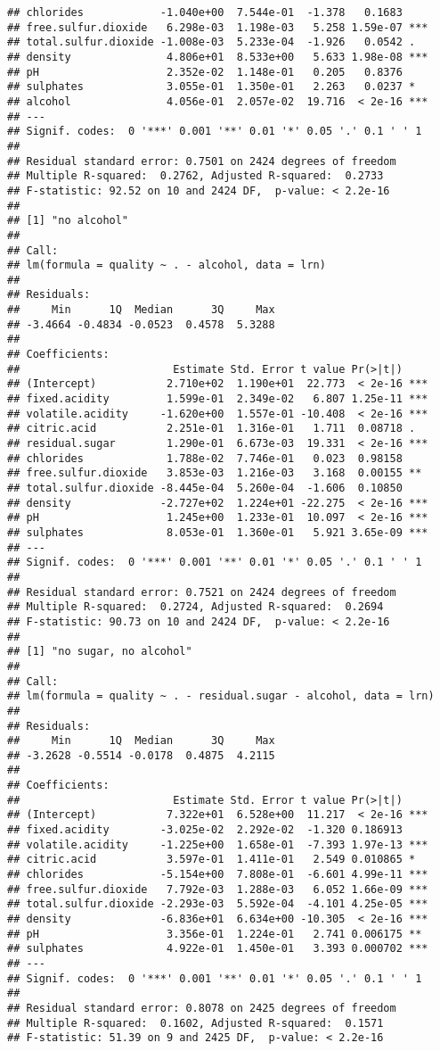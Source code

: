 \documentclass[
]{article}
\begin{document}
\begin{verbatim}
## chlorides            -1.040e+00  7.544e-01  -1.378   0.1683    
## free.sulfur.dioxide   6.298e-03  1.198e-03   5.258 1.59e-07 ***
## total.sulfur.dioxide -1.008e-03  5.233e-04  -1.926   0.0542 .  
## density               4.806e+01  8.533e+00   5.633 1.98e-08 ***
## pH                    2.352e-02  1.148e-01   0.205   0.8376    
## sulphates             3.055e-01  1.350e-01   2.263   0.0237 *  
## alcohol               4.056e-01  2.057e-02  19.716  < 2e-16 ***
## ---
## Signif. codes:  0 '***' 0.001 '**' 0.01 '*' 0.05 '.' 0.1 ' ' 1
## 
## Residual standard error: 0.7501 on 2424 degrees of freedom
## Multiple R-squared:  0.2762, Adjusted R-squared:  0.2733 
## F-statistic: 92.52 on 10 and 2424 DF,  p-value: < 2.2e-16
## 
## [1] "no alcohol"
## 
## Call:
## lm(formula = quality ~ . - alcohol, data = lrn)
## 
## Residuals:
##     Min      1Q  Median      3Q     Max 
## -3.4664 -0.4834 -0.0523  0.4578  5.3288 
## 
## Coefficients:
##                        Estimate Std. Error t value Pr(>|t|)    
## (Intercept)           2.710e+02  1.190e+01  22.773  < 2e-16 ***
## fixed.acidity         1.599e-01  2.349e-02   6.807 1.25e-11 ***
## volatile.acidity     -1.620e+00  1.557e-01 -10.408  < 2e-16 ***
## citric.acid           2.251e-01  1.316e-01   1.711  0.08718 .  
## residual.sugar        1.290e-01  6.673e-03  19.331  < 2e-16 ***
## chlorides             1.788e-02  7.746e-01   0.023  0.98158    
## free.sulfur.dioxide   3.853e-03  1.216e-03   3.168  0.00155 ** 
## total.sulfur.dioxide -8.445e-04  5.260e-04  -1.606  0.10850    
## density              -2.727e+02  1.224e+01 -22.275  < 2e-16 ***
## pH                    1.245e+00  1.233e-01  10.097  < 2e-16 ***
## sulphates             8.053e-01  1.360e-01   5.921 3.65e-09 ***
## ---
## Signif. codes:  0 '***' 0.001 '**' 0.01 '*' 0.05 '.' 0.1 ' ' 1
## 
## Residual standard error: 0.7521 on 2424 degrees of freedom
## Multiple R-squared:  0.2724, Adjusted R-squared:  0.2694 
## F-statistic: 90.73 on 10 and 2424 DF,  p-value: < 2.2e-16
## 
## [1] "no sugar, no alcohol"
## 
## Call:
## lm(formula = quality ~ . - residual.sugar - alcohol, data = lrn)
## 
## Residuals:
##     Min      1Q  Median      3Q     Max 
## -3.2628 -0.5514 -0.0178  0.4875  4.2115 
## 
## Coefficients:
##                        Estimate Std. Error t value Pr(>|t|)    
## (Intercept)           7.322e+01  6.528e+00  11.217  < 2e-16 ***
## fixed.acidity        -3.025e-02  2.292e-02  -1.320 0.186913    
## volatile.acidity     -1.225e+00  1.658e-01  -7.393 1.97e-13 ***
## citric.acid           3.597e-01  1.411e-01   2.549 0.010865 *  
## chlorides            -5.154e+00  7.808e-01  -6.601 4.99e-11 ***
## free.sulfur.dioxide   7.792e-03  1.288e-03   6.052 1.66e-09 ***
## total.sulfur.dioxide -2.293e-03  5.592e-04  -4.101 4.25e-05 ***
## density              -6.836e+01  6.634e+00 -10.305  < 2e-16 ***
## pH                    3.356e-01  1.224e-01   2.741 0.006175 ** 
## sulphates             4.922e-01  1.450e-01   3.393 0.000702 ***
## ---
## Signif. codes:  0 '***' 0.001 '**' 0.01 '*' 0.05 '.' 0.1 ' ' 1
## 
## Residual standard error: 0.8078 on 2425 degrees of freedom
## Multiple R-squared:  0.1602, Adjusted R-squared:  0.1571 
## F-statistic: 51.39 on 9 and 2425 DF,  p-value: < 2.2e-16
\end{verbatim}
\end{document}
